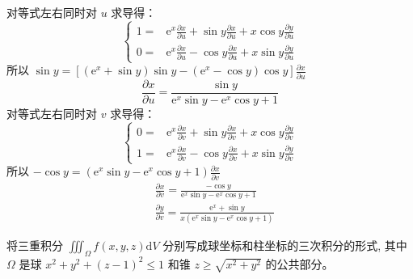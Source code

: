 \begin{solution}
对等式左右同时对 $u$ 求导得：
$$
\begin{cases}1= & \mathrm{e}^x \frac{\partial x}{\partial u}+\sin y \frac{\partial x}{\partial u}+x \cos y \frac{\partial y}{\partial u} \\ 0= & \mathrm{e}^x \frac{\partial x}{\partial u}-\cos y \frac{\partial x}{\partial u}+x \sin y \frac{\partial y}{\partial u}\end{cases}
$$
所以 $\sin y=\left[\left(\mathrm{e}^x+\sin y\right) \sin y-\left(\mathrm{e}^x-\cos y\right) \cos y\right] \frac{\partial x}{\partial u}$
$$
\frac{\partial x}{\partial u}=\frac{\sin y}{\mathrm{e}^x \sin y-\mathrm{e}^x \cos y+1}
$$
对等式左右同时对 $v$ 求导得：
$$
\begin{cases}0= & \mathrm{e}^x \frac{\partial x}{\partial v}+\sin y \frac{\partial x}{\partial v}+x \cos y \frac{\partial y}{\partial v} \\ 1= & \mathrm{e}^x \frac{\partial x}{\partial v}-\cos y \frac{\partial x}{\partial v}+x \sin y \frac{\partial y}{\partial v}\end{cases}
$$
所以 $-\cos y=\left(\mathrm{e}^x \sin y-\mathrm{e}^x \cos y+1\right) \frac{\partial x}{\partial v}$
$$
\begin{aligned}
& \frac{\partial x}{\partial v}=\frac{-\cos y}{\mathrm{e}^x \sin y-\mathrm{e}^x \cos y+1} \\
& \frac{\partial y}{\partial v}=\frac{\mathrm{e}^x+\sin y}{x\left(\mathrm{e}^x \sin y-\mathrm{e}^x \cos y+1\right)}
\end{aligned}
$$
\end{solution}
\begin{exercise}
    将三重积分 $\iiint_{\Omega} f(x, y, z) \mathrm{d} V$ 分别写成球坐标和柱坐标的三次积分的形式, 其中 $\Omega$ 是球 $x^2+y^2+(z-1)^2 \leqslant 1$ 和锥 $z \geqslant \sqrt{x^2+y^2}$ 的公共部分。
\end{exercise}
